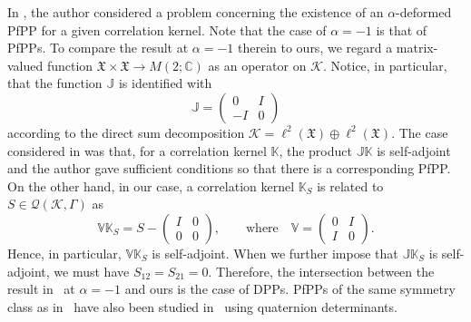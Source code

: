 \documentclass[pdftex]{sigma}
\numberwithin{equation}{section}
\newcommand{\mfrak}[1]{\mathfrak{#1}}
\newcommand{\mcal}[1]{\mathcal{#1}}
\newcommand{\mbb}[1]{\mathbb{#1}}
\begin{document}
\begin{Remark} In \cite{Matsumoto2005b}, the author considered a problem concerning the existence of an $\alpha$-deformed PfPP for a given correlation kernel. Note that the case of $\alpha=-1$ is that of \mbox{PfPPs}. To compare the result at $\alpha=-1$ therein to ours, we regard a matrix-valued function $\mfrak{X}\times\mfrak{X}\to M(2;\mbb{C})$ as an operator on $\mcal{K}$. Notice, in particular, that the function $\mbb{J}$ is identified with
\begin{equation*}
	\mbb{J}=\left(
	\begin{matrix}
		0 & I \\
		-I & 0
	\end{matrix}
	\right)
\end{equation*}
according to the direct sum decomposition $\mcal{K}=\ell^{2}(\mfrak{X})\oplus\ell^{2}(\mfrak{X})$. The case considered in \cite{Matsumoto2005b} was that, for a correlation kernel $\mbb{K}$, the product $\mbb{J}\mbb{K}$ is self-adjoint and the author gave sufficient conditions so that there is a corresponding PfPP. On the other hand, in our case, a correlation kernel $\mbb{K}_{S}$ is related to $S\in\mcal{Q}(\mcal{K},\Gamma)$ as
\begin{equation*}
	\mbb{V}\mbb{K}_{S}=S-
	\left(
	\begin{matrix}
	I & 0 \\
	0 & 0
	\end{matrix}
	\right),\qquad \mbox{where}\quad
	\mbb{V}=\left(
	\begin{matrix}
	0 & I \\
	I & 0
	\end{matrix}
	\right).
\end{equation*}
Hence, in particular, $\mbb{V}\mbb{K}_{S}$ is self-adjoint. When we further impose that $\mbb{J}\mbb{K}_{S}$ is self-adjoint, we must have $S_{12}=S_{21}=0$.
Therefore, the intersection between the result in~\cite{Matsumoto2005b} at $\alpha=-1$ and ours is the case of DPPs.
PfPPs of the same symmetry class as in~\cite{Matsumoto2005b} have also been studied in~\cite{Kargin2014,KasselLevy2019} using quaternion determinants.
\end{Remark}
\end{document}
